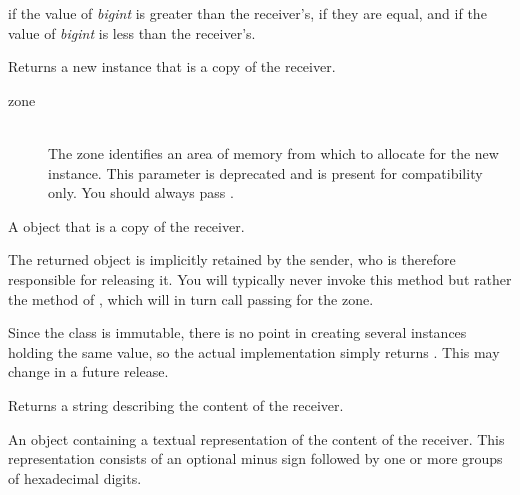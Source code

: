 \docretval

 if the value of \emph{bigint} is greater than the receiver’s,  if they are equal, and  if the value of \emph{bigint} is less than the receiver’s.



Returns a new instance that is a copy of the receiver. 


\docparams

\begin{description}
\item[zone] \hfill \\ The zone identifies an area of memory from which to allocate for the new instance. This parameter is deprecated and is present for compatibility only. You should always pass .
\end{description}

\docretval

A  object that is a copy of the receiver.

\docdiscuss

The returned object is implicitly retained by the sender, who is therefore responsible for releasing it. You will typically never invoke this method but rather the  method of , which will in turn call  passing  for the zone.

Since the  class is immutable, there is no point in creating several instances holding the same value, so the actual implementation simply returns . This may change in a future release.



Returns a string describing the content of the receiver.


\docretval

An  object containing a textual representation of the content of the receiver. This representation consists of an optional minus sign followed by one or more groups of hexadecimal digits.

\docdiscuss

